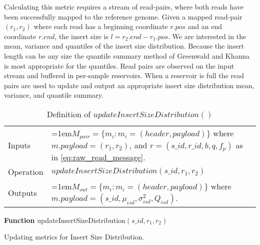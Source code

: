 Calculating this metric requires a stream of read-pairs, where both reads have been successfully mapped to the reference genome. Given a mapped read-pair $(r_1,r_2)$ where each read has a beginning coordinate $r.pos$ and an end coordinate $r.end$, the insert size is $l = r_2.end - r_1.pos$. We are interested in the mean, variance and quantiles of the insert size distribution. Because the insert length can be any size the quantile summary method of Greenwald and Khanna\autocite{greenwald2001space} is most appropriate for the quantiles. Read pairs are observed on the input stream and buffered in per-sample reservoirs. When a reservoir is full the read pairs are used to update and output an appropriate insert size distribution mean, variance, and quantile summary.

\bgroup
\def\arraystretch{1.5}
\begin{table}[!ht]
    \caption{Definition of $updateInsertSizeDistribution()$}
    \label{tab:op_update_insert_size_dist}
    {\begin{tabular}{l|p{12cm}}
    \toprule
    Inputs & \hangindent=1em$M_{pair} = \{m_i: m_i = (header, payload)\}$ where $m.payload = (r_1,r_2)$, and $r = (s\_id, r\_id, b, q, f_p)$ as in \ref{eq:raw_read_message}. \\
    \cline{2-2}
    Operation & $updateInsertSizeDistribution(s\_id,r_1, r_2)$\\
    \cline{2-2}
    {Outputs} & \hangindent=1em$M_{out} = \{m_i: m_i = (header, payload)\}$ where $m.payload = (s\_id, \mu_{isd}, \sigma_{isd}^2, Q_{isd})$.\\
    \bottomrule
    \end{tabular}}
\end{table}
\egroup

\begin{algorithm2e}[h]
    \DontPrintSemicolon
    \footnotesize
    \textbf{Function} {\sc updateInsertSizeDistribution}$(s\_id, r_1,r_2)$
    \caption{Updating metrics for Insert Size Distribution.}\label{ag:update_metrics_isd}
\end{algorithm2e}

